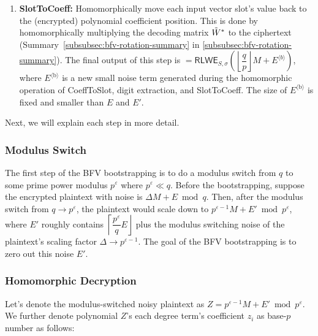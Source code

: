 \begin{enumerate}
$ $

Importantly, the scaling factor re-interpretation does not require any actual computation; we only change the way of interpreting the ciphertext. We will cover this in more detail. later. 


$ $


\item \textbf{\textsf{SlotToCoeff}:} Homomorphically move each input vector slot's value back to the (encrypted) polynomial coefficient position. This is done by homomorphically multiplying the decoding matrix $\tilde{W}^*$ to the ciphertext (Summary~\ref*{subsubsec:bfv-rotation-summary} in \autoref{subsubsec:bfv-rotation-summary}). The final output of this step is $ = \textsf{RLWE}_{S, \sigma}\left(\left\lfloor\dfrac{q}{p}\right\rfloor M  + E^{\langle b \rangle}\right)$, where $E^{\langle \text{b} \rangle}$ is a new small noise term generated during the homomorphic operation of \textsf{CoeffToSlot}, digit extraction, and \textsf{SlotToCoeff}. The size of $E^{\langle \text{b} \rangle}$ is fixed and smaller than $E$ and $E'$. 

\end{enumerate}


Next, we will explain each step in more detail. 

\subsubsection{Modulus Switch}
\label{subsubsec:bfv-bootstrapping-modulus-switch}

The first step of the BFV bootstrapping is to do a modulus switch from $q$ to some prime power modulus $p^\varepsilon$ where $p^\varepsilon \ll q$. Before the bootstrapping, suppose the encrypted plaintext with noise is $\Delta M + E \bmod q$. Then, after the modulus switch from $q \rightarrow p^\varepsilon$, the plaintext would scale down to $p^{\varepsilon-1}M + E' \bmod p^\varepsilon$, where $E'$ roughly contains $\left\lceil\dfrac{p^\varepsilon}{q} E\right\rfloor$ plus the modulus switching noise of the plaintext's scaling factor $\Delta \rightarrow p^{\varepsilon-1}$. The goal of the BFV bootstrapping is to zero out this noise $E'$.  

\subsubsection{Homomorphic Decryption}
\label{subsubsec:bfv-bootstrapping-homomorphic-decryption}

Let's denote the modulus-switched noisy plaintext as $Z = p^{\varepsilon-1}M + E' \bmod p^\varepsilon$. We further denote polynomial $Z$'s each degree term's coefficient $z_i$ as base-$p$ number as follows: 

